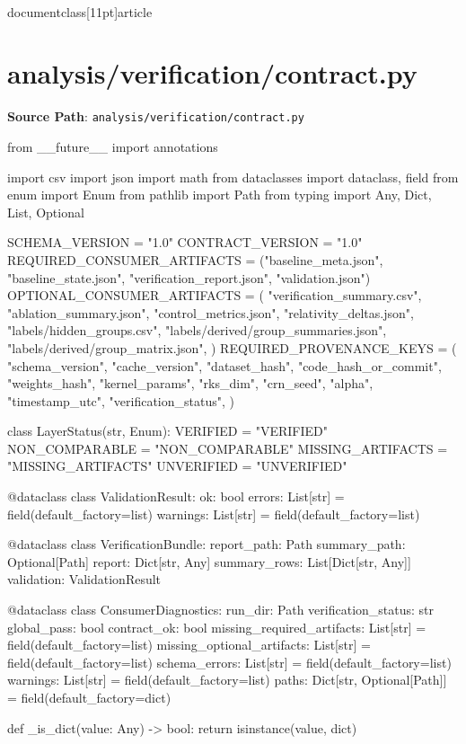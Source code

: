 \\documentclass[11pt]{article}
\begin{document}
\section*{analysis/verification/contract.py}
\textbf{Source Path}: \texttt{analysis/verification/contract.py}\par
\bigskip
\begin{CodeBlock}
﻿from __future__ import annotations

import csv
import json
import math
from dataclasses import dataclass, field
from enum import Enum
from pathlib import Path
from typing import Any, Dict, List, Optional


SCHEMA_VERSION = "1.0"
CONTRACT_VERSION = "1.0"
REQUIRED_CONSUMER_ARTIFACTS = ("baseline_meta.json", "baseline_state.json", "verification_report.json", "validation.json")
OPTIONAL_CONSUMER_ARTIFACTS = (
    "verification_summary.csv",
    "ablation_summary.json",
    "control_metrics.json",
    "relativity_deltas.json",
    "labels/hidden_groups.csv",
    "labels/derived/group_summaries.json",
    "labels/derived/group_matrix.json",
)
REQUIRED_PROVENANCE_KEYS = (
    "schema_version",
    "cache_version",
    "dataset_hash",
    "code_hash_or_commit",
    "weights_hash",
    "kernel_params",
    "rks_dim",
    "crn_seed",
    "alpha",
    "timestamp_utc",
    "verification_status",
)


class LayerStatus(str, Enum):
    VERIFIED = "VERIFIED"
    NON_COMPARABLE = "NON_COMPARABLE"
    MISSING_ARTIFACTS = "MISSING_ARTIFACTS"
    UNVERIFIED = "UNVERIFIED"


@dataclass
class ValidationResult:
    ok: bool
    errors: List[str] = field(default_factory=list)
    warnings: List[str] = field(default_factory=list)


@dataclass
class VerificationBundle:
    report_path: Path
    summary_path: Optional[Path]
    report: Dict[str, Any]
    summary_rows: List[Dict[str, Any]]
    validation: ValidationResult


@dataclass
class ConsumerDiagnostics:
    run_dir: Path
    verification_status: str
    global_pass: bool
    contract_ok: bool
    missing_required_artifacts: List[str] = field(default_factory=list)
    missing_optional_artifacts: List[str] = field(default_factory=list)
    schema_errors: List[str] = field(default_factory=list)
    warnings: List[str] = field(default_factory=list)
    paths: Dict[str, Optional[Path]] = field(default_factory=dict)


def _is_dict(value: Any) -> bool:
    return isinstance(value, dict)



\end{CodeBlock}
\end{document}
